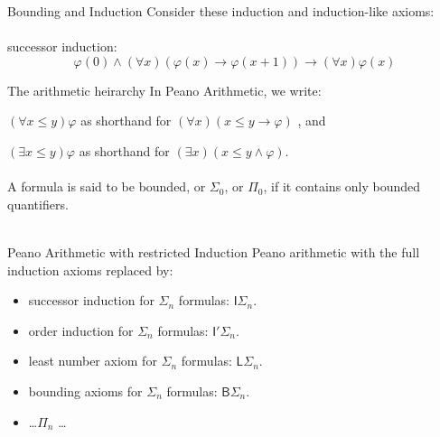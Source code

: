 \documentclass{beamer}
\newcommand{\vs}{\\~\\}
\begin{document}
\begin{frame}{Bounding and Induction}
  Consider these induction and induction-like axioms:
  \vs
  successor induction:
  \begin{equation*}
    \varphi(0) \land (\forall x)(\varphi(x) \to \varphi(x+1)) \to (\forall x)\varphi(x)
  \end{equation*}
\end{frame}

\begin{frame}{The arithmetic heirarchy}
  In Peano Arithmetic, we write:

  $(\forall x \leq y)\varphi$ as shorthand for $(\forall x)(x \leq y \to \varphi)$
  , and

  $(\exists x \leq y)\varphi$ as shorthand for $(\exists x)(x \leq y \land \varphi)$.
  \vs
  A formula is said to be bounded, or $\Sigma_0$, or $\Pi_0$, if it contains
  only bounded quantifiers.
  \vs
\end{frame}

\begin{frame}{Peano Arithmetic with restricted Induction}
  Peano arithmetic with the full induction axioms replaced by:
  \begin{itemize}
    \item successor induction for $\Sigma_n$ formulas: $\mathsf{I}\Sigma_n$.
    \item order induction for $\Sigma_n$ formulas: $\mathsf{I}'\Sigma_n$.
    \item least number axiom for $\Sigma_n$ formulas: $\mathsf{L}\Sigma_n$.
    \item bounding axioms for $\Sigma_n$ formulas: $\mathsf{B}\Sigma_n$.
    \item \ldots $\Pi_n$ \ldots
  \end{itemize}
\end{frame}
\end{document}
